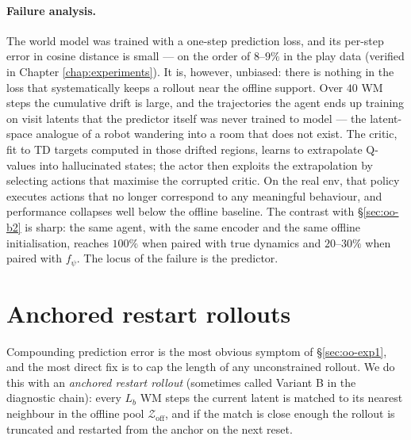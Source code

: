 \paragraph{Failure analysis.} The world model was trained with a one-step prediction loss, and its per-step error in cosine distance is small --- on the order of $8$--$9\%$ in the play data (verified in Chapter \ref{chap:experiments}). It is, however, unbiased: there is nothing in the loss that systematically keeps a rollout near the offline support. Over $40$ WM steps the cumulative drift is large, and the trajectories the agent ends up training on visit latents that the predictor itself was never trained to model --- the latent-space analogue of a robot wandering into a room that does not exist. The critic, fit to TD targets computed in those drifted regions, learns to extrapolate Q-values into hallucinated states; the actor then exploits the extrapolation by selecting actions that maximise the corrupted critic. On the real env, that policy executes actions that no longer correspond to any meaningful behaviour, and performance collapses well below the offline baseline. The contrast with \S\ref{sec:oo-b2} is sharp: the same agent, with the same encoder and the same offline initialisation, reaches $100\%$ when paired with true dynamics and $20$--$30\%$ when paired with $f_\psi$. The locus of the failure is the predictor.

\section{Anchored restart rollouts}
\label{sec:oo-exp2}

Compounding prediction error is the most obvious symptom of \S\ref{sec:oo-exp1}, and the most direct fix is to cap the length of any unconstrained rollout. We do this with an \emph{anchored restart rollout} (sometimes called Variant B in the diagnostic chain): every $L_b$ WM steps the current latent is matched to its nearest neighbour in the offline pool $\mathcal{Z}_{\text{off}}$, and if the match is close enough the rollout is truncated and restarted from the anchor on the next reset.

